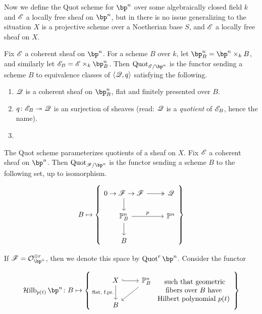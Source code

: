\documentclass[12pt]{article}
\begin{document}
Now we define the Quot scheme for $\bp^n$ over some algebraically closed field $k$ and $\mathscr{E}$ a locally free sheaf on $\bp^n$, but in there is no issue generalizing to the situation $X$ is a projective scheme over a Noetherian base $S$, and $\mathscr{E}$ a locally free sheaf on $X$. 
\begin{defn}
  Fix $\mathscr{E}$ a coherent sheaf on $\bp^n$. For a scheme $B$ over $k$, let $\bp^n_B = \bp^n \times_k B$, and similarly let $\fane_{B} = \fane \times_k \bp^n_B$. Then $\Quot_{\fane/\bp^n}$ is the functor sending a scheme $B$ to equivalence classes of $\langle \mathscr{Q}, q \rangle$ satisfying the following.
  \begin{enumerate}[label=(\roman*)]
      \item $\mathscr{Q}$ is a coherent sheaf on $\bp^n_B$, flat and finitely presented over $B$.
      \item $q \colon \mathscr{E}_{B} \twoheadrightarrow \mathscr{Q}$ is an surjection of sheaves (read: $\mathscr{Q}$ is a \textit{quotient} of $\mathscr{E}_B$, hence the name).
      \item 
  \end{enumerate}
\end{defn}
The Quot scheme parameterizes quotients of a sheaf on $X$. Fix $\mathscr{E}$ a coherent sheaf on $\bp^n$. Then $\text{Quot}_{\fanf/\bp^n}$ is the functor sending a scheme $B$ to the following set, up to isomorphism.

\[B \mapsto \left\{\begin{tikzcd}
0 \to \fanf \to \fanf \arrow[d] \arrow[r, two heads] & {\fanq} \\
\mathbb{P}^n_B \arrow[d] \arrow[r, "p"]      & \mathbb{P}^n                           \\
B                                              &                                       
\end{tikzcd}\right\}\]

If $\fanf = \calo_{\bp^n}^{\oplus r}$, then we denote this space by $\Quot^r \bp^n$. Consider the functor

\[\Hilb_{p(t)} \bp^n \colon B \mapsto \left\{\begin{tikzcd}
X \arrow[d, "{\text{flat, f.pr.}}"'] \arrow[r, hook] & \mathbb{P}^n_B \arrow[ld] \\
B                                                    &                          
\end{tikzcd} \begin{array}{c}
\text{ such that geometric} \\
\text{fibers over } B \text{ have} \\
\text{Hilbert polynomial } p(t)
\end{array}\right\}\]
\end{document}
